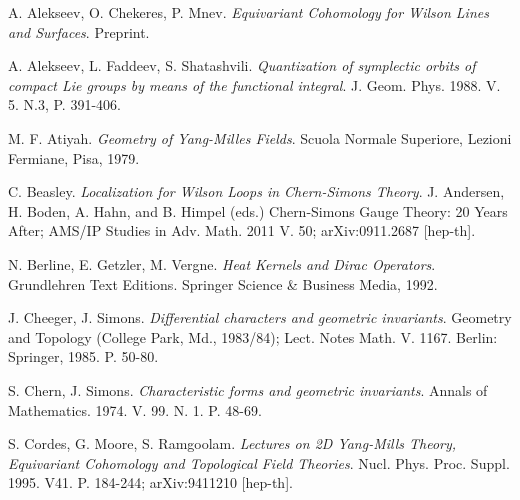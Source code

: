 \documentclass[11pt]{report}
\theoremstyle{plain}
\theoremstyle{definition}
\theoremstyle{remark}
\theoremstyle{remark}
\numberwithin{equation}{section}
\begin{document}
%
%
 






\begin{thebibliography}{9}

 A. Alekseev, O. Chekeres, P. Mnev. 
\textit{Equivariant Cohomology for Wilson Lines and Surfaces}.
Preprint.

 A. Alekseev, L. Faddeev, S. Shatashvili. 
\textit{Quantization of symplectic orbits of compact Lie groups by means of the functional integral}.
 J. Geom. Phys. 1988. V. 5. N.3, P. 391-406.
 
 M. F. Atiyah. 
\textit{Geometry of Yang-Milles Fields}.
 Scuola Normale Superiore, Lezioni Fermiane, Pisa, 1979.
 
 C. Beasley.
\textit{Localization for Wilson Loops in Chern-Simons Theory}.
J. Andersen, H. Boden, A. Hahn, and B. Himpel (eds.) Chern-Simons Gauge Theory: 20 Years After;
AMS/IP Studies in Adv. Math. 2011 V. 50; arXiv:0911.2687 [hep-th].
 
 N. Berline, E. Getzler, M. Vergne. 
\textit{Heat Kernels and Dirac Operators}. 
Grundlehren Text Editions. Springer Science \& Business Media, 1992. 

 J. Cheeger, J. Simons. 
\textit{Differential characters and geometric invariants}.
 Geometry and Topology (College Park, Md., 1983/84); Lect. Notes Math. V. 1167. Berlin: Springer, 1985. P. 50-80.
 
 S. Chern, J. Simons. 
\textit{Characteristic forms and geometric invariants}. 
Annals of Mathematics. 1974. V. 99. N. 1. P. 48-69.

 S. Cordes, G. Moore, S. Ramgoolam. 
\textit{Lectures on 2D Yang-Mills Theory, Equivariant Cohomology and Topological Field Theories}. 
Nucl. Phys. Proc. Suppl. 1995. V41. P. 184-244; arXiv:9411210 [hep-th].


\end{thebibliography}
\end{document}
